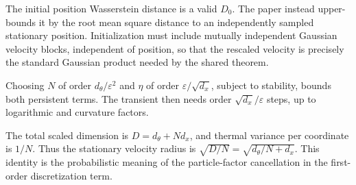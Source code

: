 \documentclass[11pt,a4paper]{report}
\begin{document}
The initial position Wasserstein distance is a valid \(D_0\).
The paper instead upper-bounds it by the root mean square distance to an
independently sampled stationary position. Initialization must include mutually
independent Gaussian velocity blocks, independent of position, so that the
rescaled velocity is precisely the standard Gaussian product needed by the
shared theorem.




Choosing \(N\) of order \(d_\theta/\varepsilon^2\) and \(\eta\) of
order \(\varepsilon/\sqrt{d_x}\), subject to stability, bounds both persistent terms. The transient then needs order \(\sqrt{d_x}/\varepsilon\) steps,
up to logarithmic and curvature factors.



The total scaled dimension is \(D=d_\theta+Nd_x\), and thermal variance per coordinate is \(1/N\). Thus the stationary velocity radius is \(\sqrt{D/N}=\sqrt{d_\theta/N+d_x}\). This identity is the probabilistic meaning of the particle-factor cancellation in the first-order discretization term.
\end{document}

